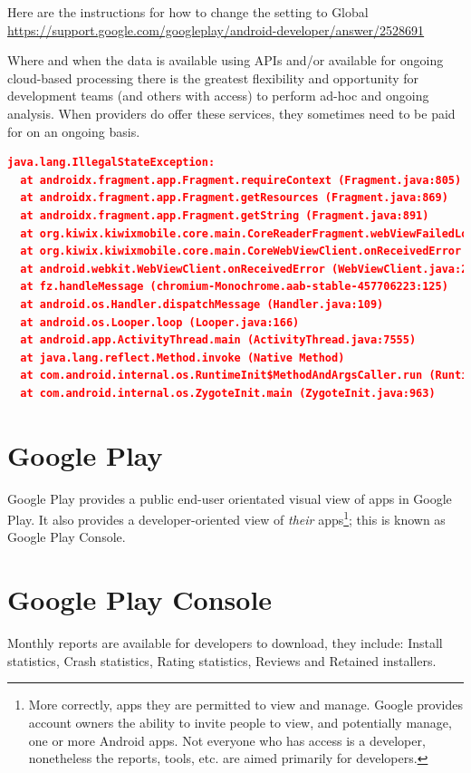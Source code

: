 Here are the instructions for how to change the setting to Global \url{https://support.google.com/googleplay/android-developer/answer/2528691}

Where and when the data is available using APIs and/or available for ongoing cloud-based processing there is the greatest flexibility and opportunity for development teams (and others with access) to perform ad-hoc and ongoing analysis. When providers do offer these services, they sometimes need to be paid for on an ongoing basis. 

\begin{lstlisting}[language=json, caption=Exported contents for a crash reported in Android Vitals in Sept 2021, label=listing:crash-stack-trace-in-kiwix]
  java.lang.IllegalStateException: 
  at androidx.fragment.app.Fragment.requireContext (Fragment.java:805)
  at androidx.fragment.app.Fragment.getResources (Fragment.java:869)
  at androidx.fragment.app.Fragment.getString (Fragment.java:891)
  at org.kiwix.kiwixmobile.core.main.CoreReaderFragment.webViewFailedLoading (CoreReaderFragment.java:1478)
  at org.kiwix.kiwixmobile.core.main.CoreWebViewClient.onReceivedError (CoreWebViewClient.java:112)
  at android.webkit.WebViewClient.onReceivedError (WebViewClient.java:298)
  at fz.handleMessage (chromium-Monochrome.aab-stable-457706223:125)
  at android.os.Handler.dispatchMessage (Handler.java:109)
  at android.os.Looper.loop (Looper.java:166)
  at android.app.ActivityThread.main (ActivityThread.java:7555)
  at java.lang.reflect.Method.invoke (Native Method)
  at com.android.internal.os.RuntimeInit$MethodAndArgsCaller.run (RuntimeInit.java:469)
  at com.android.internal.os.ZygoteInit.main (ZygoteInit.java:963)
\end{lstlisting}

\section{Google Play}
Google Play provides a public end-user orientated visual view of apps in Google Play. It also provides a developer-oriented view of \emph{their} apps\footnote{More correctly, apps they are permitted to view and manage. Google provides account owners the ability to invite people to view, and potentially manage, one or more Android apps. Not everyone who has access is a developer, nonetheless the reports, tools, etc. are aimed primarily for developers.}; this is known as Google Play Console.

\section{Google Play Console}
Monthly reports are available for developers to download, they include: Install statistics, Crash statistics, Rating statistics, Reviews and Retained installers. 

